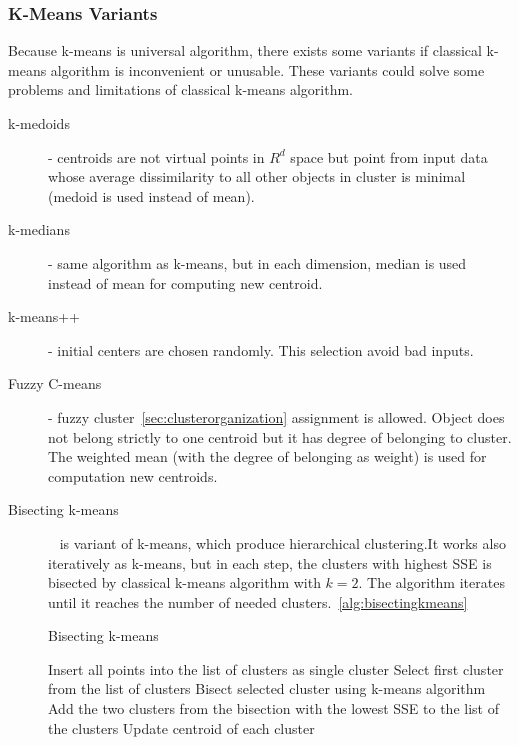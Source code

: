 \subsubsection{K-Means Variants}
Because k-means is universal algorithm, there exists some variants if classical k-means algorithm is inconvenient or unusable. These variants could solve some problems and limitations of classical k-means algorithm.
\begin{description}
\item[k-medoids] - centroids are not virtual points in $R^d$ space but point from input data whose average dissimilarity to all other objects in cluster is minimal (medoid is used instead of mean).
\item[k-medians] - same algorithm as k-means, but in each dimension, median is used instead of mean for computing new centroid.
\item[k-means++] - initial centers are chosen randomly. This selection avoid bad inputs.
\item[Fuzzy C-means] - fuzzy cluster~\ref{sec:clusterorganization} assignment is allowed. Object does not belong strictly to one centroid but it has degree of belonging to cluster. The weighted mean (with the degree of belonging as weight) is used for computation new centroids.
\item[Bisecting k-means]~\cite{Tan05} is variant of k-means, which produce hierarchical clustering.It works also iteratively as k-means, but in each step, the clusters with highest SSE is bisected by classical k-means algorithm with $k=2$. The algorithm iterates until it reaches the number of needed clusters.~\autoref{alg:bisectingkmeans}
\begin{algorithm}
\caption{Bisecting k-means}\label{alg:bisectingkmeans}
\begin{algorithmic}[1]
\State Insert all points into the list of clusters as single cluster
\Repeat
\State Select first cluster from the list of clusters
\State Bisect selected cluster using k-means algorithm
\EndFor
\State Add the two clusters from the bisection with the lowest SSE to the list of the clusters
\State Update centroid of each cluster
\end{algorithmic}
\end{algorithm}

\end{description}
